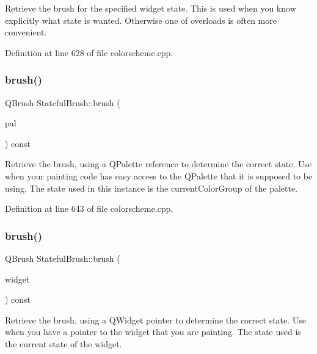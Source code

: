 Retrieve the brush for the specified widget state. This is used when you know explicitly what state is wanted. Otherwise one of overloads is often more convenient. 

Definition at line 628 of file colorscheme.\+cpp.

\mbox{\label{class_stateful_brush_ab69204943e8c2be8e19640340ce1501d}} 
\subsubsection{\texorpdfstring{brush()}{brush()}\hspace{0.1cm}{\footnotesize\ttfamily [2/3]}}
{\footnotesize\ttfamily Q\+Brush Stateful\+Brush\+::brush (\begin{DoxyParamCaption}\item[{const Q\+Palette \&}]{pal }\end{DoxyParamCaption}) const}

Retrieve the brush, using a Q\+Palette reference to determine the correct state. Use when your painting code has easy access to the Q\+Palette that it is supposed to be using. The state used in this instance is the current\+Color\+Group of the palette. 

Definition at line 643 of file colorscheme.\+cpp.

\mbox{\label{class_stateful_brush_adc96d0a37f1c4a9b13e4587b82742851}} 
\subsubsection{\texorpdfstring{brush()}{brush()}\hspace{0.1cm}{\footnotesize\ttfamily [3/3]}}
{\footnotesize\ttfamily Q\+Brush Stateful\+Brush\+::brush (\begin{DoxyParamCaption}\item[{const Q\+Widget $\ast$}]{widget }\end{DoxyParamCaption}) const}

Retrieve the brush, using a Q\+Widget pointer to determine the correct state. Use when you have a pointer to the widget that you are painting. The state used is the current state of the widget.

